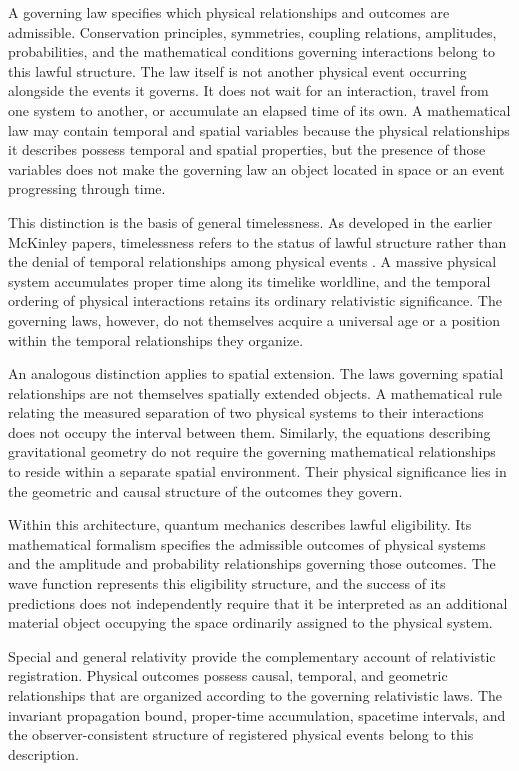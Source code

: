\documentclass[12pt,onecolumn]{article}
\begin{document}
A governing law specifies which physical relationships and outcomes are admissible. Conservation principles, symmetries, coupling relations, amplitudes, probabilities, and the mathematical conditions governing interactions belong to this lawful structure. The law itself is not another physical event occurring alongside the events it governs. It does not wait for an interaction, travel from one system to another, or accumulate an elapsed time of its own. A mathematical law may contain temporal and spatial variables because the physical relationships it describes possess temporal and spatial properties, but the presence of those variables does not make the governing law an object located in space or an event progressing through time.

This distinction is the basis of general timelessness. As developed in the earlier McKinley papers, timelessness refers to the status of lawful structure rather than the denial of temporal relationships among physical events \cite{GeneralTimelessness2026,TimeNotGlobal2026}. A massive physical system accumulates proper time along its timelike worldline, and the temporal ordering of physical interactions retains its ordinary relativistic significance. The governing laws, however, do not themselves acquire a universal age or a position within the temporal relationships they organize.

An analogous distinction applies to spatial extension. The laws governing spatial relationships are not themselves spatially extended objects. A mathematical rule relating the measured separation of two physical systems to their interactions does not occupy the interval between them. Similarly, the equations describing gravitational geometry do not require the governing mathematical relationships to reside within a separate spatial environment. Their physical significance lies in the geometric and causal structure of the outcomes they govern.

Within this architecture, quantum mechanics describes lawful eligibility. Its mathematical formalism specifies the admissible outcomes of physical systems and the amplitude and probability relationships governing those outcomes. The wave function represents this eligibility structure, and the success of its predictions does not independently require that it be interpreted as an additional material object occupying the space ordinarily assigned to the physical system.

Special and general relativity provide the complementary account of relativistic registration. Physical outcomes possess causal, temporal, and geometric relationships that are organized according to the governing relativistic laws. The invariant propagation bound, proper-time accumulation, spacetime intervals, and the observer-consistent structure of registered physical events belong to this description.
\end{document}
